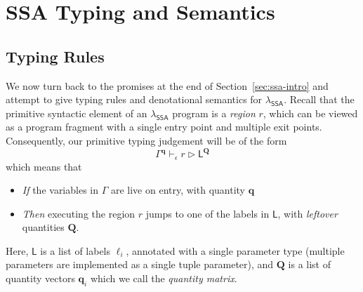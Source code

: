 \documentclass[acmsmall,screen,review]{acmart}
\newcommand{\mc}[1]{\ensuremath{\mathcal{#1}}}
\newcommand{\mb}[1]{\ensuremath{\mathbf{#1}}}
\newcommand{\ms}[1]{\ensuremath{\mathsf{#1}}}
\newcommand{\hasty}[4]{#1 \vdash_{#2} #3: {#4}}
\newcommand{\haslb}[4]{#1 \vdash_{#2} #3 \rhd #4}
\newcommand{\teqv}{\approx}
\newcommand{\tref}{\twoheadrightarrow}
\newcommand{\tmle}[5]{#1 \vdash_{#2} #3 \tref #4 : {#5}}
\newcommand{\tmeq}[5]{#1 \vdash_{#2} #3 \teqv #4 : {#5}}
\newcommand{\dnt}[1]{\llbracket{#1}\rrbracket}
\newcommand{\isotopessa}{\(\lambda_{\ms{SSA}}\)}
\begin{document}

\section{SSA Typing and Semantics}

\subsection{Typing Rules}

We now turn back to the promises at the end of Section~\ref{sec:ssa-intro} and attempt to give 
typing rules and denotational semantics for \isotopessa{}. Recall that the primitive syntactic 
element of an \isotopessa{} program is a \emph{region} $r$, which can be viewed as a program 
fragment with a single entry point and multiple exit points. Consequently, our primitive typing 
judgement will be of the form
$$
\boxed{\haslb{\Gamma^{\mb{q}}}{\epsilon}{r}{\ms{L}^{\mb{Q}}}}
$$
which means that
\begin{itemize}
  \item \emph{If} the variables in $\Gamma$ are live on entry, with quantity $\mb{q}$
  \item \emph{Then} executing the region $r$ jumps to one of the labels in $\ms{L}$, with 
  \emph{leftover} quantities $\mb{Q}$.
\end{itemize}
Here, $\ms{L}$ is a list of labels $\ell_i$, annotated with a single parameter type 
(multiple parameters are implemented as a single tuple parameter), and $\mb{Q}$ is a list of 
quantity vectors $\mb{q}_i$ which we call the \emph{quantity matrix}.
\end{document}

